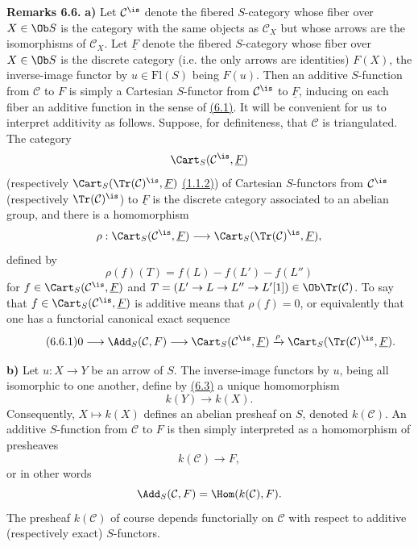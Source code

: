\textbf{Remarks 6.6.} \textbf{a)} Let \(\mathcal C^{\is}\) denote the fibered \(S\)-category whose fiber over \(X\in\Ob S\) is the category with the same objects as \(\mathcal C_X\) but whose arrows are the isomorphisms of \(\mathcal C_X\). Let \(\underline F\) denote the fibered \(S\)-category whose fiber over \(X\in\Ob S\) is the discrete category (i.e. the only arrows are identities) \(F(X)\), the inverse-image functor by \(u\in\mathrm{Fl}(S)\) being \(F(u)\). Then an additive \(S\)-function from \(\mathcal C\) to \(F\) is simply a Cartesian \(S\)-functor from \(\mathcal C^{\is}\) to \(\underline F\), inducing on each fiber an additive function in the sense of \hyperlink{sga6.e01.def.6-1}{(6.1)}. It will be convenient for us to interpret additivity as follows. Suppose, for definiteness, that \(\mathcal C\) is triangulated. The category
\[
  \Cart_S(\mathcal C^{\is},\underline F)
\]
(respectively \(\Cart_S(\Tr(\mathcal C)^{\is},\underline F)\) \hyperlink{sga6.e01.para.1-1-2}{(1.1.2)}) of Cartesian \(S\)-functors from \(\mathcal C^{\is}\) (respectively \(\Tr(\mathcal C)^{\is}\)) to \(\underline F\) is the discrete category associated to an abelian group, and there is a homomorphism
\[
  \rho:\Cart_S(\mathcal C^{\is},\underline F)
  \longrightarrow
  \Cart_S(\Tr(\mathcal C)^{\is},\underline F),
\]
defined by
\[
  \rho(f)(T)=f(L)-f(L')-f(L'')
\]
for \(f\in\Cart_S(\mathcal C^{\is},\underline F)\) and \(T=(L'\to L\to L''\to L'[1])\in\Ob\Tr(\mathcal C)\). To say that \(f\in\Cart_S(\mathcal C^{\is},\underline F)\) is additive means that \(\rho(f)=0\), or equivalently that one has a functorial canonical exact sequence
\begin{equation}\tag{6.6.1}
  0\longrightarrow \Add_S(\mathcal C,F)
  \longrightarrow \Cart_S(\mathcal C^{\is},\underline F)
  \xrightarrow{\rho}
  \Cart_S(\Tr(\mathcal C)^{\is},\underline F).
\end{equation}

\textbf{b)} Let \(u:X\to Y\) be an arrow of \(S\). The inverse-image functors by \(u\), being all isomorphic to one another, define by \hyperlink{sga6.e01.para.6-3}{(6.3)} a unique homomorphism
\[
  k(Y)\longrightarrow k(X).
\]
Consequently, \(X\mapsto k(X)\) defines an abelian presheaf on \(S\), denoted \(k(\mathcal C)\). An additive \(S\)-function from \(\mathcal C\) to \(F\) is then simply interpreted as a homomorphism of presheaves
\[
  k(\mathcal C)\longrightarrow F,
\]
or in other words
\[
  \Add_S(\mathcal C,F)=\Hom(k(\mathcal C),F).
\]
The presheaf \(k(\mathcal C)\) of course depends functorially on \(\mathcal C\) with respect to additive (respectively exact) \(S\)-functors.

